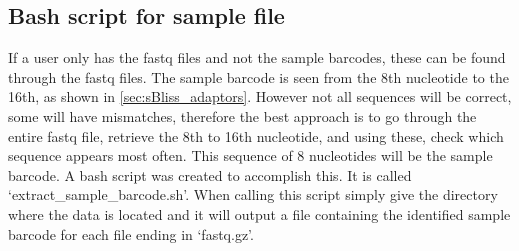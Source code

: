 \subsection{Bash script for sample file}
If a user only has the fastq files and not the sample barcodes, these can be found through the fastq files. The sample barcode is seen from the 8th nucleotide to the 16th, as shown in \autoref{sec:sBliss_adaptors}. However not all sequences will be correct, some will have mismatches, therefore the best approach is to go through the entire fastq file, retrieve the 8th to 16th nucleotide, and using these, check which sequence appears most often. This sequence of 8 nucleotides will be the sample barcode. A bash script was created to accomplish this. It is called `extract\_sample\_barcode.sh'. When calling this script simply give the directory where the data is located and it will output a file containing the identified sample barcode for each file ending in `fastq.gz'.


